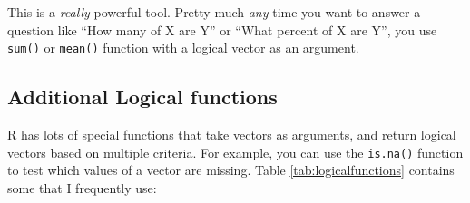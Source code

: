 \documentclass[]{book}
\theoremstyle{definition}
\theoremstyle{definition}
\theoremstyle{remark}
\begin{document}
This is a \emph{really} powerful tool. Pretty much \emph{any} time you
want to answer a question like ``How many of X are Y'' or ``What percent
of X are Y'', you use \texttt{sum()} or \texttt{mean()} function with a
logical vector as an argument.

\subsection{Additional Logical
functions}\label{additional-logical-functions}

R has lots of special functions that take vectors as arguments, and
return logical vectors based on multiple criteria. For example, you can
use the \texttt{is.na()} function to test which values of a vector are
missing. Table \ref{tab:logicalfunctions} contains some that I
frequently use:
\end{document}
